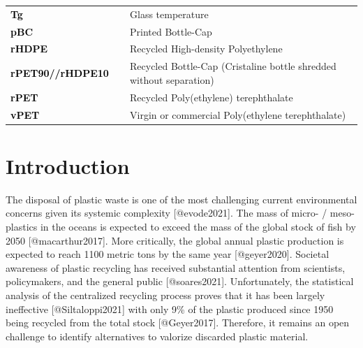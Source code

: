 \documentclass[
  letterpaper,
  DIV=11,
  numbers=noendperiod]{scrartcl}
\begin{document}
\begin{tabular}{>{}ll}
\textcolor{black}{\textbf{Tg }} & Glass temperature \\
\textcolor{black}{\textbf{pBC }} & Printed Bottle-Cap \\
\textcolor{black}{\textbf{rHDPE }} & Recycled High-density Polyethylene \\
\textcolor{black}{\textbf{rPET90//rHDPE10  }} & Recycled Bottle-Cap (Cristaline bottle shredded without separation) \\
\textcolor{black}{\textbf{rPET }} & Recycled Poly(ethylene) terephthalate \\
\textcolor{black}{\textbf{vPET }} & Virgin or commercial Poly(ethylene terephthalate) \\
\bottomrule
\end{tabular}
\endgroup{}


\hypertarget{introduction}{%
\section{Introduction}\label{introduction}}

\linenumbers

The disposal of plastic waste is one of the most challenging current
environmental concerns given its systemic complexity {[}@evode2021{]}.
The mass of micro- / meso- plastics in the oceans is expected to exceed
the mass of the global stock of fish by 2050 {[}@macarthur2017{]}. More
critically, the global annual plastic production is expected to reach
1100 metric tons by the same year {[}@geyer2020{]}. Societal awareness
of plastic recycling has received substantial attention from scientists,
policymakers, and the general public {[}@soares2021{]}. Unfortunately,
the statistical analysis of the centralized recycling process proves
that it has been largely ineffective {[}@Siltaloppi2021{]} with only 9\%
of the plastic produced since 1950 being recycled from the total stock
{[}@Geyer2017{]}. Therefore, it remains an open challenge to identify
alternatives to valorize discarded plastic material.
\end{document}
